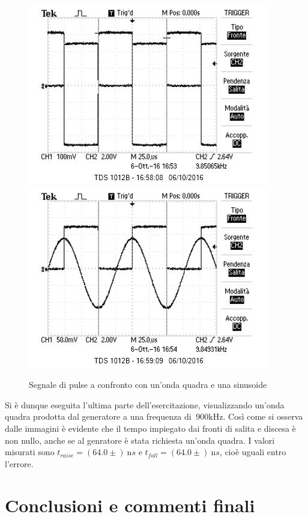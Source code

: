 \documentclass[10pt,a4paper]{article}
\begin{document}
\begin{figure}[h]
	\centering
	\includegraphics[scale=0.6]{../Oscilloscopio/trig_pulse_square.jpg}
	\includegraphics[scale=0.6]{../Oscilloscopio/trig_pulse_sin.jpg}
	\caption{Segnale di pulse a confronto con un'onda quadra e una sinusoide}
	\label{f:pulse}
\end{figure}

Si è dunque eseguita l'ultima parte dell'esercitazione, visualizzando un'onda quadra prodotta dal generatore a una frequenza di $~900 \text{kHz}$.
Così come si osserva dalle immagini è evidente che il tempo impiegato dai fronti di salita e discesa è non nullo, anche se al genratore è stata richiesta un'onda quadra. I valori misurati sono $t_{raise} = (64.0 \pm )~\text{n}s$ e $t_{fall} = (64.0 \pm )~\text{n}s$, cioè uguali entro l'errore. 

\section{Conclusioni e commenti finali}
\end{document}
